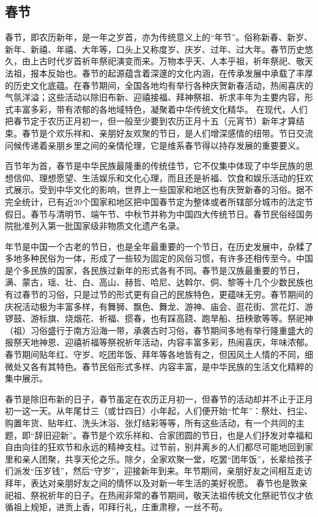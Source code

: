 \subsection{春节}
\par
春节，即农历新年，是一年之岁首，亦为传统意义上的“年节”。俗称新春、新岁、新年、新禧、年禧、大年等，口头上又称度岁、庆岁、过年、过大年。春节历史悠久，由上古时代岁首祈年祭祀演变而来。万物本乎天、人本乎祖，祈年祭祀、敬天法祖，报本反始也。春节的起源蕴含着深邃的文化内涵，在传承发展中承载了丰厚的历史文化底蕴。在春节期间，全国各地均有举行各种庆贺新春活动，热闹喜庆的气氛洋溢；这些活动以除旧布新、迎禧接福、拜神祭祖、祈求丰年为主要内容，形式丰富多彩，带有浓郁的各地域特色，凝聚着中华传统文化精华。
在现代，人们把春节定于农历正月初一，但一般至少要到农历正月十五（元宵节）新年才算结束。春节是个欢乐祥和、亲朋好友欢聚的节日，是人们增深感情的纽带。节日交流问候传递着亲朋乡里之间的亲情伦理，它是维系春节得以持存发展的重要要义。
\par
百节年为首，春节是中华民族最隆重的传统佳节，它不仅集中体现了中华民族的思想信仰、理想愿望、生活娱乐和文化心理，而且还是祈福、饮食和娱乐活动的狂欢式展示。受到中华文化的影响，世界上一些国家和地区也有庆贺新春的习俗。据不完全统计，已有近20个国家和地区把中国春节定为整体或者所辖部分城市的法定节假日。春节与清明节、端午节、中秋节并称为中国四大传统节日。春节民俗经国务院批准列入第一批国家级非物质文化遗产名录。   
\par
年节是中国一个古老的节日，也是全年最重要的一个节日，在历史发展中，杂糅了多地多种民俗为一体，形成了一些较为固定的风俗习惯，有许多还相传至今。中国是个多民族的国家，各民族过新年的形式各有不同。春节是汉族最重要的节日，满、蒙古，瑶、壮、白、高山、赫哲、哈尼、达斡尔、侗、黎等十几个少数民族也有过春节的习俗，只是过节的形式更有自己的民族特色，更蕴味无穷。春节期间的庆祝活动极为丰富多样，有舞狮、飘色、舞龙、游神、庙会、逛花街、赏花灯、游锣鼓、游标旗、烧烟花、祈福、掼春，也有踩高跷、跑旱船、扭秧歌等等。祭祀神（祖）习俗盛行于南方沿海一带，承袭古时习俗，春节期间多地有举行隆重盛大的报祭天地神恩、迎禧祈福等祭祝祈年活动，内容丰富多彩，热闹喜庆，年味浓郁。春节期间贴年红、守岁、吃团年饭、拜年等各地皆有之，但因风土人情的不同，细微处又各有其特色。春节民俗形式多样、内容丰富，是中华民族的生活文化精粹的集中展示。
\par
春节是除旧布新的日子，春节虽定在农历正月初一，但春节的活动却并不止于正月初一这一天。从年尾廿三（或廿四日）小年起，人们便开始“忙年”：祭灶、扫尘、购置年货、贴年红、洗头沐浴、张灯结彩等等，所有这些活动，有一个共同的主题，即“辞旧迎新”。春节是个欢乐祥和、合家团圆的节日，也是人们抒发对幸福和自由向往的狂欢节和永远的精神支柱。过节前，别井离乡的人们都尽可能地回到家里和亲人团聚，共享天伦之乐。除夕，全家欢聚一堂，吃罢“团年饭”，长辈给孩子们派发“压岁钱”，然后“守岁”，迎接新年到来。年节期间，亲朋好友之间相互走访拜年，表达对亲朋好友之间的情怀以及对新一年生活的美好祝愿。
春节也是敦亲祀祖、祭祝祈年的日子。在热闹非常的春节期间，敬天法祖传统文化祭祀节仪才依循祖上规矩，进贡上香，叩拜行礼，庄重肃穆，一丝不苟。

